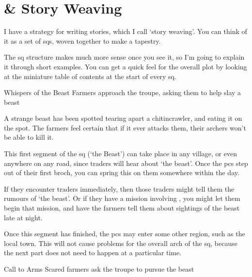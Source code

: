 \chapter{ \& Story Weaving}

\label{sidequests}

\togglefalse{genExamples}

\begin{multicols}{2}

\noindent
I have a strategy for writing stories, which I call `story weaving'.
You can think of it as a set of \glspl{sq}, woven together to make a tapestry.

The \gls{sq} structure makes much more sense once you see it, so I'm going to explain it through short examples.
You can get a quick feel for the overall plot by looking at the miniature table of contents at the start of every \gls{sq}.


{Whispers of the Beast}%
{Farmers approach the troupe, asking them to help slay a beast}%

\begin{exampletext}
  A strange beast has been spotted tearing apart a chitincrawler, and eating it on the spot.
  The farmers feel certain that if it ever attacks them, their archers won't be able to kill it.
\end{exampletext}

This first \gls{segment} of the \gls{sq} (`the Beast') can take place in any \gls{village}, or even anywhere on any road, since traders will hear about `the beast'.
Once the \glspl{pc} step out of their first \gls{broch}, you can spring this on them somewhere within the day.

If they encounter traders immediately, then those traders might tell them the rumours of `the beast'.
Or if they have a mission involving , you might let them begin that mission, and have the farmers tell them about sightings of the beast late at night.

Once this \gls{segment} has finished, the \glspl{pc} may enter some other region, such as the local town.
This will not cause problems for the overall arch of the \gls{sq}, because the next part does not need to happen at a particular time.

{Call to Arms}%
{Scared farmers ask the troupe to pursue the beast}%


\end{multicols}
